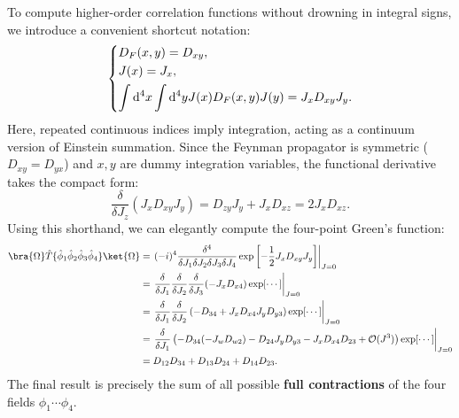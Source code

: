 \begin{example}
    To compute higher-order correlation functions without drowning in integral signs, we introduce a convenient shortcut notation:
    \[
        \begin{dcases}
            D_F(x, y) = D_{xy}, \\
            J(x) = J_x,         \\
            \int \mathrm{d}^4 x \int \mathrm{d}^4 y J(x) D_F(x,y) J(y) = J_x D_{xy} J_y.
        \end{dcases}
    \]
    Here, repeated continuous indices imply integration, acting as a continuum version of Einstein summation. Since the Feynman propagator is symmetric (\(D_{xy} = D_{yx}\)) and \(x, y\) are dummy integration variables, the functional derivative takes the compact form:
    \[
        \frac{\delta}{\delta J_z} (J_x D_{xy} J_y) = D_{zy} J_y + J_x D_{xz} = 2 J_x D_{xz}.
    \]
    Using this shorthand, we can elegantly compute the four-point Green's function:
    \[
        \begin{aligned}
            \bra{\Omega} \hat{T} \{\hat{\phi}_1 \hat{\phi}_2 \hat{\phi}_3 \hat{\phi}_4\} \ket{\Omega} & = \left. (-i)^4 \frac{\delta^4}{\delta J_1 \delta J_2 \delta J_3 \delta J_4} \exp\left[-\frac{1}{2} J_x D_{xy} J_y\right] \right|_{J=0}                    \\
                                                                                                      & = \left. \frac{\delta}{\delta J_1} \frac{\delta}{\delta J_2} \frac{\delta}{\delta J_3} (-J_x D_{x4}) \exp[\cdots] \right|_{J=0}                            \\
                                                                                                      & = \left. \frac{\delta}{\delta J_1} \frac{\delta}{\delta J_2} \left(-D_{34} + J_x D_{x4} J_y D_{y3} \right)\exp[\cdots] \right|_{J=0}                       \\
                                                                                                      & = \left. \frac{\delta}{\delta J_1} \left( -D_{34}(-J_w D_{w2}) - D_{24}J_y D_{y3} - J_x D_{x4}D_{23} + \mathcal{O}(J^3) \right) \exp[\cdots] \right|_{J=0} \\
                                                                                                      & = D_{12} D_{34} + D_{13} D_{24} + D_{14} D_{23}.
        \end{aligned}
    \]
    The final result is precisely the sum of all possible \textbf{full contractions} of the four fields \(\phi_1 \cdots \phi_4\).
\end{example}

